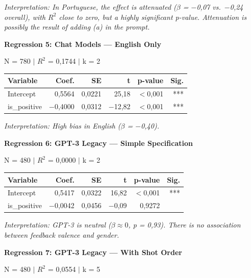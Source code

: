 \documentclass[jair,11pt,letterpaper]{article}
\begin{document}
\noindent\textit{Interpretation: In Portuguese, the effect is attenuated ($\beta$ = $-$0,07 vs.\ $-$0,24
overall), with $R^2$ close to zero, but a highly significant p-value.
Attenuation is possibly the result of adding (a) in the prompt.}

\vspace{0.5cm}
\noindent\textbf{Regression 5: Chat Models --- English Only}

\noindent N = 780 $|$ $R^2$ = 0,1744 $|$ k = 2

\begin{table}[H]
\centering
\begin{tabular}{lrrrrr}
\toprule
\textbf{Variable} & \textbf{Coef.} & \textbf{SE} & \textbf{t} & \textbf{p-value} & \textbf{Sig.} \\
\midrule
Intercept & 0,5564 & 0,0221 & 25,18 & $<$0,001 & *** \\
is\_positive & $-$0,4000 & 0,0312 & $-$12,82 & $<$0,001 & *** \\
\bottomrule
\end{tabular}
\end{table}

\noindent\textit{Interpretation: High bias in English ($\beta$ = $-$0,40).}

\vspace{0.5cm}
\noindent\textbf{Regression 6: GPT-3 Legacy --- Simple Specification}

\noindent N = 480 $|$ $R^2$ = 0,0000 $|$ k = 2

\begin{table}[H]
\centering
\begin{tabular}{lrrrrr}
\toprule
\textbf{Variable} & \textbf{Coef.} & \textbf{SE} & \textbf{t} & \textbf{p-value} & \textbf{Sig.} \\
\midrule
Intercept & 0,5417 & 0,0322 & 16,82 & $<$0,001 & *** \\
is\_positive & $-$0,0042 & 0,0456 & $-$0,09 & 0,9272 & \\
\bottomrule
\end{tabular}
\end{table}

\noindent\textit{Interpretation: GPT-3 is neutral ($\beta \approx 0$, p = 0,93). There is no association
between feedback valence and gender.}

\vspace{0.5cm}
\noindent\textbf{Regression 7: GPT-3 Legacy --- With Shot Order}

\noindent N = 480 $|$ $R^2$ = 0,0554 $|$ k = 5
\end{document}
